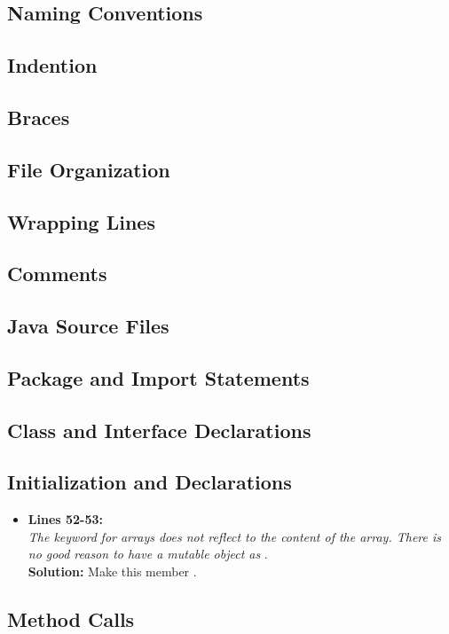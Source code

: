 
\subsection{Naming Conventions}
\subsection{Indention}
\subsection{Braces}
\subsection{File Organization}
\subsection{Wrapping Lines}
\subsection{Comments}
\subsection{Java Source Files}
\subsection{Package and Import Statements}
\subsection{Class and Interface Declarations}
\subsection{Initialization and Declarations}
\begin{itemize}
	\item \textbf{Lines 52-53:}\\
\textit{ The keyword } \textit{for arrays does not reflect to the content of the array. There is no good reason to have a mutable object as} . \\
\textbf{Solution: }Make this member . 
\end{itemize}

\subsection{Method Calls}

